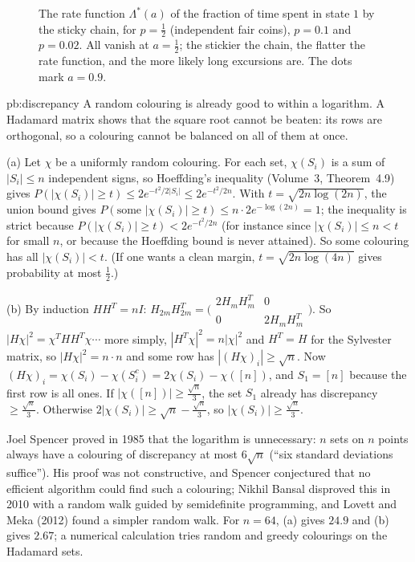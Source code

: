 \begin{figure}[ht]
\centering{}
\caption{The rate function $\Lambda^*(a)$ of the fraction of time spent in state $1$ by the sticky chain, for $p=\frac12$ (independent fair coins), $p=0.1$ and $p=0.02$.
All vanish at $a=\frac12$; the stickier the chain, the flatter the rate function, and the more likely long excursions are. The dots mark $a=0.9$.}
\label{fig:markovrate}
\end{figure}

\begin{solution}{pb:discrepancy}
\idea A random colouring is already good to within a logarithm. A Hadamard matrix shows that the square root cannot be beaten: its rows are orthogonal, so a colouring
cannot be balanced on all of them at once.

\writeup (a) Let $\chi$ be a uniformly random colouring. For each set, $\chi(S_i)$ is a sum of $|S_i|\le n$ independent signs, so Hoeffding's inequality (Volume~3, Theorem~4.9) gives
$P(|\chi(S_i)|\ge t)\le2e^{-t^2/2|S_i|}\le2e^{-t^2/2n}$. With $t=\sqrt{2n\log(2n)}$, the union bound gives $P(\text{some }|\chi(S_i)|\ge t)\le n\cdot2e^{-\log(2n)}=1$; the
inequality is strict because $P(|\chi(S_i)|\ge t)<2e^{-t^2/2n}$ (for instance since $|\chi(S_i)|\le n<t$ for small $n$, or because the Hoeffding bound is never attained). So some
colouring has all $|\chi(S_i)|<t$. (If one wants a clean margin, $t=\sqrt{2n\log(4n)}$ gives probability at most $\frac12$.)

(b) By induction $HH^T=nI$: $H_{2m}H_{2m}^T=\bigl(\begin{smallmatrix}2H_mH_m^T&0\\0&2H_mH_m^T\end{smallmatrix}\bigr)$. So $|H\chi|^2=\chi^THH^T\chi\cdots$ more simply, $|H^T\chi|^2=n|\chi|^2$
and $H^T=H$ for the Sylvester matrix, so $|H\chi|^2=n\cdot n$ and some row has $|(H\chi)_i|\ge\sqrt n$. Now $(H\chi)_i=\chi(S_i)-\chi(S_i^c)=2\chi(S_i)-\chi([n])$, and $S_1=[n]$ because
the first row is all ones. If $|\chi([n])|\ge\frac{\sqrt n}3$, the set $S_1$ already has discrepancy $\ge\frac{\sqrt n}3$. Otherwise
$2|\chi(S_i)|\ge\sqrt n-\frac{\sqrt n}3$, so $|\chi(S_i)|\ge\frac{\sqrt n}3$.

\leads Joel Spencer proved in 1985 that the logarithm is unnecessary: $n$ sets on $n$ points always have a colouring of discrepancy at most $6\sqrt n$ (``six standard deviations
suffice''). His proof was not constructive, and Spencer conjectured that no efficient algorithm could find such a colouring; Nikhil Bansal disproved this in 2010 with a random
walk guided by semidefinite programming, and Lovett and Meka (2012) found a simpler random walk. For $n=64$, (a) gives $24.9$ and (b) gives $2.67$; a numerical calculation tries random and
greedy colourings on the Hadamard sets.
\end{solution}

